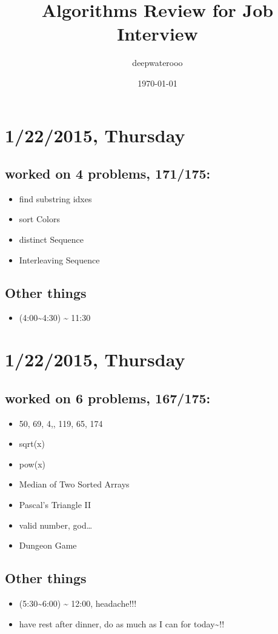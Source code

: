 \documentclass[9pt,b5paper]{article}
\author{deepwaterooo}
\date{\today}
\title{Algorithms Review for Job Interview}
\begin{document}
\maketitle
\tableofcontents


\section{1/22/2015, Thursday}
\label{sec-1}
\subsection{worked on 4 problems, 171/175:}
\label{sec-1-1}
\begin{itemize}
\item find substring idxes
\item sort Colors
\item distinct Sequence
\item Interleaving Sequence
\end{itemize}
\subsection{Other things}
\label{sec-1-2}
\begin{itemize}
\item (4:00\textasciitilde{}4:30) \textasciitilde{} 11:30
\end{itemize}
\section{1/22/2015, Thursday}
\label{sec-2}
\subsection{worked on 6 problems, 167/175:}
\label{sec-2-1}
\begin{itemize}
\item 50, 69, 4,, 119, 65, 174
\item sqrt(x)
\item pow(x)
\item Median of Two Sorted Arrays
\item Pascal's Triangle II
\item valid number, god\ldots{}
\item Dungeon Game
\end{itemize}
\subsection{Other things}
\label{sec-2-2}
\begin{itemize}
\item (5:30\textasciitilde{}6:00) \textasciitilde{} 12:00, headache!!!
\item have rest after dinner, do as much as I can for today\textasciitilde{}!!
\end{itemize}
\end{document}
